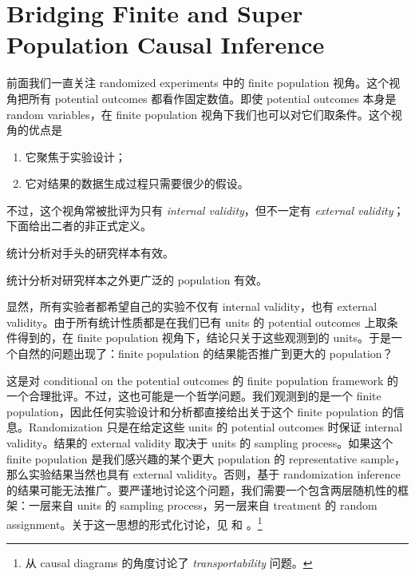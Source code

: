 \chapter{Bridging Finite and Super Population Causal Inference}\label{chapter::bridging}


 


前面我们一直关注 randomized experiments 中的 finite population 视角。这个视角把所有 potential outcomes 都看作固定数值。即使 potential outcomes 本身是 random variables，在 finite population 视角下我们也可以对它们取条件。这个视角的优点是
\begin{enumerate}
\item
它聚焦于实验设计；
\item
它对结果的数据生成过程只需要很少的假设。
\end{enumerate}
不过，这个视角常被批评为只有 {\it  internal validity}，但不一定有 {\it external validity}；下面给出二者的非正式定义。 

\begin{definition}
统计分析对手头的研究样本有效。 
\end{definition}


\begin{definition}
统计分析对研究样本之外更广泛的 population 有效。 
\end{definition}



显然，所有实验者都希望自己的实验不仅有 internal validity，也有 external validity。由于所有统计性质都是在我们已有 units 的 potential outcomes 上取条件得到的，在 finite population 视角下，结论只关于这些观测到的 units。于是一个自然的问题出现了：finite population 的结果能否推广到更大的 population？ 



这是对 conditional on the potential outcomes 的 finite population framework 的一个合理批评。不过，这也可能是一个哲学问题。我们观测到的是一个 finite population，因此任何实验设计和分析都直接给出关于这个 finite population 的信息。Randomization 只是在给定这些 units 的 potential outcomes 时保证 internal validity。结果的 external validity 取决于 units 的 sampling process。如果这个 finite population 是我们感兴趣的某个更大 population 的 representative sample，那么实验结果当然也具有 external validity。否则，基于 randomization inference 的结果可能无法推广。要严谨地讨论这个问题，我们需要一个包含两层随机性的框架：一层来自 units 的 sampling process，另一层来自 treatment 的 random assignment。关于这一思想的形式化讨论，见 \citet{miratrix2018worth} 和 \citet{abadie2020sampling}。\footnote{\citet{pearl2014external} 从 causal diagrams 的角度讨论了 {\it transportability} 问题。}
  
